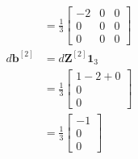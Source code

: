 \begin{itemize}
\begin{align*}
    &= \frac{1}{3}\begin{bmatrix} -2 & 0 & 0 \\ 0 & 0 & 0 \\ 0 & 0 & 0 \end{bmatrix} \\
    d\mathbf{b}^{[2]} &= d\mathbf{Z}^{[2]}\mathbf{1}_3 \\
    &= \frac{1}{3}\begin{bmatrix} 1 - 2 + 0 \\ 0 \\ 0 \end{bmatrix} \\
    &= \frac{1}{3}\begin{bmatrix} -1 \\ 0 \\ 0 \end{bmatrix}
    \end{align*}


\end{itemize}
